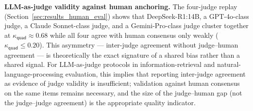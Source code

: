 \textbf{LLM-as-judge validity against human anchoring.} The four-judge replay (Section~\ref{sec:results_human_eval}) shows that DeepSeek-R1:14B, a GPT-4o-class judge, a Claude Sonnet-class judge, and a Gemini-Pro-class judge cluster together at $\kappa_{\textsf{quad}} \approx 0.68$ while all four agree with human consensus only weakly ($\kappa_{\textsf{quad}} \leq 0.20$). This asymmetry --- inter-judge agreement without judge--human agreement --- is theoretically the exact signature of a shared bias rather than a shared signal. For LLM-as-judge protocols in information-retrieval and natural-language-processing evaluation, this implies that reporting inter-judge agreement as evidence of judge validity is insufficient; validation against human consensus on the same items remains necessary, and the size of the judge--human gap (not the judge--judge agreement) is the appropriate quality indicator.
